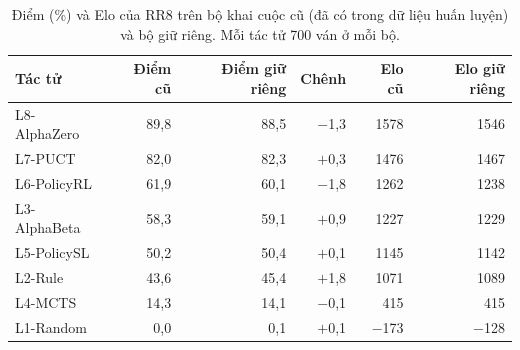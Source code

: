 \begin{table}[H]
  \centering\small
  \caption{Điểm (\%) và Elo của RR8 trên bộ khai cuộc cũ (đã có trong dữ liệu huấn luyện) và bộ giữ riêng. Mỗi tác tử 700 ván ở mỗi bộ.}
  \label{tab:rr8-so-sanh}
  \setlength{\tabcolsep}{4pt}
  \begin{tabular}{@{}lrrrrr@{}}
    \toprule
    Tác tử & Điểm cũ & Điểm giữ riêng & Chênh & Elo cũ & Elo giữ riêng \\
    \midrule
    L8-AlphaZero & 89{,}8 & 88{,}5 & $-$1{,}3 & 1578 & 1546 \\
    L7-PUCT & 82{,}0 & 82{,}3 & $+$0{,}3 & 1476 & 1467 \\
    L6-PolicyRL & 61{,}9 & 60{,}1 & $-$1{,}8 & 1262 & 1238 \\
    L3-AlphaBeta & 58{,}3 & 59{,}1 & $+$0{,}9 & 1227 & 1229 \\
    L5-PolicySL & 50{,}2 & 50{,}4 & $+$0{,}1 & 1145 & 1142 \\
    L2-Rule & 43{,}6 & 45{,}4 & $+$1{,}8 & 1071 & 1089 \\
    L4-MCTS & 14{,}3 & 14{,}1 & $-$0{,}1 & 415 & 415 \\
    L1-Random & 0{,}0 & 0{,}1 & $+$0{,}1 & $-$173 & $-$128 \\
    \bottomrule
  \end{tabular}
\end{table}
